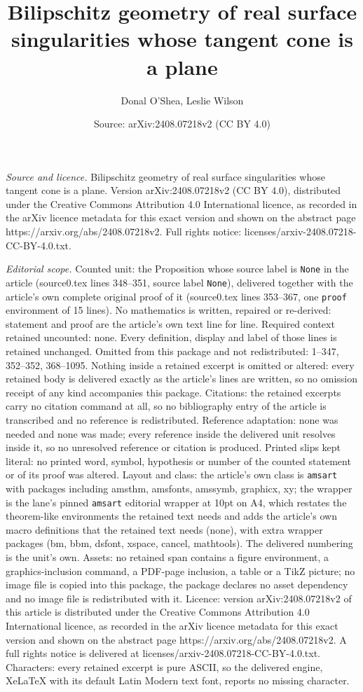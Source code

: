 \documentclass[10pt,a4paper]{amsart}
\title[Bilipschitz geometry of real surface singularities whose tan]{Bilipschitz geometry of real surface singularities whose tangent cone is a plane}
\author{Donal O'Shea, Leslie Wilson}
\date{Source: arXiv:2408.07218v2 (CC BY 4.0)}
\begin{document}
\maketitle

\noindent\emph{Source and licence.} Bilipschitz geometry of real surface singularities whose tangent cone is a plane. Version arXiv:2408.07218v2 (CC BY 4.0), distributed under the Creative Commons Attribution 4.0 International licence, as recorded in the arXiv licence metadata for this exact version and shown on the abstract page https://arxiv.org/abs/2408.07218v2. Full rights notice: licenses/arxiv-2408.07218-CC-BY-4.0.txt.\par\smallskip

\noindent\textit{Editorial scope.} Counted unit: the Proposition whose source label is \texttt{None} in the article (source0.tex lines 348--351, source label \texttt{None}), delivered together with the article's own complete original proof of it (source0.tex lines 353--367, one \texttt{proof} environment of 15 lines). No mathematics is written, repaired or re-derived: statement and proof are the article's own text line for line. Required context retained uncounted: none. Every definition, display and label of those lines is retained unchanged. Omitted from this package and not redistributed: 1--347, 352--352, 368--1095. Nothing inside a retained excerpt is omitted or altered: every retained body is delivered exactly as the article's lines are written, so no omission receipt of any kind accompanies this package. Citations: the retained excerpts carry no citation command at all, so no bibliography entry of the article is transcribed and no reference is redistributed. Reference adaptation: none was needed and none was made; every reference inside the delivered unit resolves inside it, so no unresolved reference or citation is produced. Printed slips kept literal: no printed word, symbol, hypothesis or number of the counted statement or of its proof was altered. Layout and class: the article's own class is \texttt{amsart} with packages including amsthm, amsfonts, amssymb, graphicx, xy; the wrapper is the lane's pinned \texttt{amsart} editorial wrapper at 10pt on A4, which restates the theorem-like environments the retained text needs and adds the article's own macro definitions that the retained text needs (none), with extra wrapper packages (bm, bbm, dsfont, xspace, cancel, mathtools). The delivered numbering is the unit's own. Assets: no retained span contains a figure environment, a graphics-inclusion command, a PDF-page inclusion, a table or a TikZ picture; no image file is copied into this package, the package declares no asset dependency and no image file is redistributed with it. Licence: version arXiv:2408.07218v2 of this article is distributed under the Creative Commons Attribution 4.0 International licence, as recorded in the arXiv licence metadata for this exact version and shown on the abstract page https://arxiv.org/abs/2408.07218v2. A full rights notice is delivered at licenses/arxiv-2408.07218-CC-BY-4.0.txt. Characters: every retained excerpt is pure ASCII, so the delivered engine, XeLaTeX with its default Latin Modern text font, reports no missing character.
\end{document}
